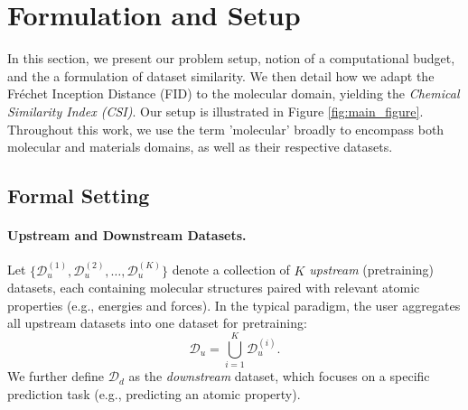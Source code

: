 \section{Formulation and Setup}
\label{3_setup}

In this section, we present our problem setup, notion of a computational budget, and the a formulation of dataset similarity. We then detail how we adapt the Fréchet Inception Distance (FID) to the molecular domain, yielding the \emph{Chemical Similarity Index (CSI)}. Our setup is illustrated in Figure \ref{fig:main_figure}. Throughout this work, we use the term 'molecular' broadly to encompass both molecular and materials domains, as well as their respective datasets.

\subsection{Formal Setting}

\paragraph{Upstream and Downstream Datasets.} Let \(\{\mathcal{D}_{u}^{(1)}, \mathcal{D}_{u}^{(2)}, \ldots, \mathcal{D}_{u}^{(K)}\}\) denote a collection of \(K\) \emph{upstream} (pretraining) datasets, each containing molecular structures paired with relevant atomic properties (e.g., energies and forces). In the typical paradigm, the user aggregates all upstream datasets into one dataset for pretraining:
\[
\mathcal{D}_u = \bigcup_{i=1}^{K} \mathcal{D}_u^{(i)}.
\]
We further define \(\mathcal{D}_{d}\) as the \emph{downstream} dataset, which focuses on a specific prediction task (e.g., predicting an atomic property).




